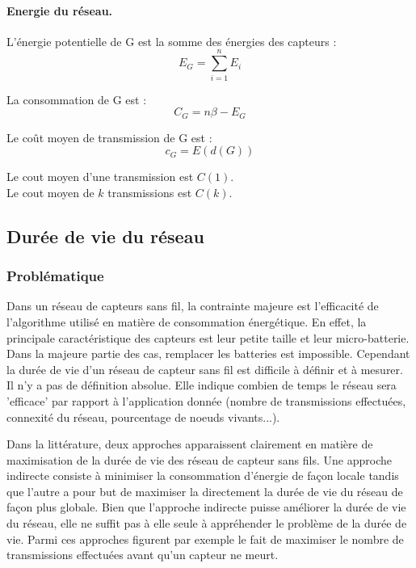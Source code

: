 \paragraph{Energie du réseau.}
\begin{mydef}
 L'énergie potentielle de G est la somme des énergies des capteurs :$$E_G=\sum_{i=1}^n{E_i}$$
\end{mydef}
\begin{mydef}
 La consommation de  G est :$$C_G=n\beta - E_G$$
\end{mydef}
\begin{mydef}
 Le coût moyen de transmission de  G est :$$c_G=E(d(G))$$
\end{mydef}
\begin{mydef}
 Le cout moyen d'une transmission est $C(1)$.\\
 Le cout moyen de $k$ transmissions est $C(k)$.
\end{mydef}


\subsection{Durée de vie du réseau}
\subsubsection{Problématique}


Dans un réseau de capteurs sans fil, la contrainte majeure est l'efficacité de l'algorithme utilisé en matière de consommation énergétique. En effet, la principale caractéristique des capteurs
est leur petite taille et leur micro-batterie. Dans la majeure partie des cas, remplacer les batteries est impossible. Cependant la durée de vie d'un réseau de capteur sans fil est difficile à définir et à mesurer.
Il n'y a pas de définition absolue. Elle indique combien de temps le réseau sera 'efficace' par rapport à l'application donnée (nombre de transmissions effectuées, connexité du réseau, pourcentage de noeuds vivants...).

Dans la littérature, deux approches apparaissent clairement en matière de maximisation de la durée de vie des réseau de capteur sans fils. Une approche indirecte consiste à minimiser la consommation d'énergie de façon locale tandis que l'autre a pour but 
de maximiser la directement la durée de vie du réseau de façon plus globale. Bien que l'approche indirecte puisse améliorer la durée de vie du réseau, elle ne suffit pas à elle seule à appréhender le problème de la durée de vie.
Parmi ces approches figurent  par exemple le fait de maximiser le nombre de transmissions effectuées avant qu'un capteur ne meurt.

